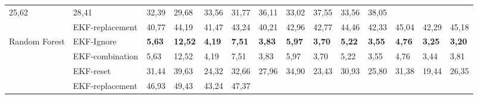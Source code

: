 \documentclass[letterpaper, 10 pt, conference]{ieeeconf}  %
\begin{document}
\begin{table*}[]
\begin{tabular}{@{}llllllllllllll@{}}
	\multicolumn{1}{l|}{25,62} &
	\multicolumn{1}{l|}{28,41} &
	\multicolumn{1}{l|}{32,39} &
	\multicolumn{1}{l|}{29,68} &
	\multicolumn{1}{l|}{33,56} &
	\multicolumn{1}{l|}{31,77} &
	\multicolumn{1}{l|}{36,11} &
	\multicolumn{1}{l|}{33,02} &
	\multicolumn{1}{l|}{37,55} &
	\multicolumn{1}{l|}{33,56} &
	\multicolumn{1}{l|}{38,05} \\ \cmidrule(l){2-14} 
	\multicolumn{1}{|l|}{} &
	\multicolumn{1}{l|}{EKF-replacement} &
	\multicolumn{1}{l|}{40,77} &
	\multicolumn{1}{l|}{44,19} &
	\multicolumn{1}{l|}{41,47} &
	\multicolumn{1}{l|}{43,24} &
	\multicolumn{1}{l|}{40,21} &
	\multicolumn{1}{l|}{42,96} &
	\multicolumn{1}{l|}{42,77} &
	\multicolumn{1}{l|}{44,46} &
	\multicolumn{1}{l|}{42,33} &
	\multicolumn{1}{l|}{45,04} &
	\multicolumn{1}{l|}{42,29} &
	\multicolumn{1}{l|}{45,18} \\ \midrule
	\multicolumn{1}{|l|}{\multirow{4}{*}{Random Forest}} &
	\multicolumn{1}{l|}{EKF-Ignore} &
	\multicolumn{1}{l|}{\textbf{5,63}} &
	\multicolumn{1}{l|}{\textbf{12,52}} &
	\multicolumn{1}{l|}{\textbf{4,19}} &
	\multicolumn{1}{l|}{\textbf{7,51}} &
	\multicolumn{1}{l|}{\textbf{3,83}} &
	\multicolumn{1}{l|}{\textbf{5,97}} &
	\multicolumn{1}{l|}{\textbf{3,70}} &
	\multicolumn{1}{l|}{\textbf{5,22}} &
	\multicolumn{1}{l|}{\textbf{3,55}} &
	\multicolumn{1}{l|}{\textbf{4,76}} &
	\multicolumn{1}{l|}{\textbf{3,25}} &
	\multicolumn{1}{l|}{\textbf{3,20}} \\ \cmidrule(l){2-14} 
	\multicolumn{1}{|l|}{} &
	\multicolumn{1}{l|}{EKF-combination} &
	\multicolumn{1}{l|}{5,63} &
	\multicolumn{1}{l|}{12,52} &
	\multicolumn{1}{l|}{4,19} &
	\multicolumn{1}{l|}{7,51} &
	\multicolumn{1}{l|}{3,83} &
	\multicolumn{1}{l|}{5,97} &
	\multicolumn{1}{l|}{3,70} &
	\multicolumn{1}{l|}{5,22} &
	\multicolumn{1}{l|}{3,55} &
	\multicolumn{1}{l|}{4,76} &
	\multicolumn{1}{l|}{3,44} &
	\multicolumn{1}{l|}{3,81} \\ \cmidrule(l){2-14} 
	\multicolumn{1}{|l|}{} &
	\multicolumn{1}{l|}{EKF-reset} &
	\multicolumn{1}{l|}{31,44} &
	\multicolumn{1}{l|}{39,63} &
	\multicolumn{1}{l|}{24,32} &
	\multicolumn{1}{l|}{32,66} &
	\multicolumn{1}{l|}{27,96} &
	\multicolumn{1}{l|}{34,90} &
	\multicolumn{1}{l|}{23,43} &
	\multicolumn{1}{l|}{30,93} &
	\multicolumn{1}{l|}{25,80} &
	\multicolumn{1}{l|}{31,38} &
	\multicolumn{1}{l|}{19,44} &
	\multicolumn{1}{l|}{26,35} \\ \cmidrule(l){2-14} 
	\multicolumn{1}{|l|}{} &
	\multicolumn{1}{l|}{EKF-replacement} &
	\multicolumn{1}{l|}{46,93} &
	\multicolumn{1}{l|}{49,43} &
	\multicolumn{1}{l|}{43,24} &
	\multicolumn{1}{l|}{47,37} &

\end{tabular}
\end{table*}
\end{document}
